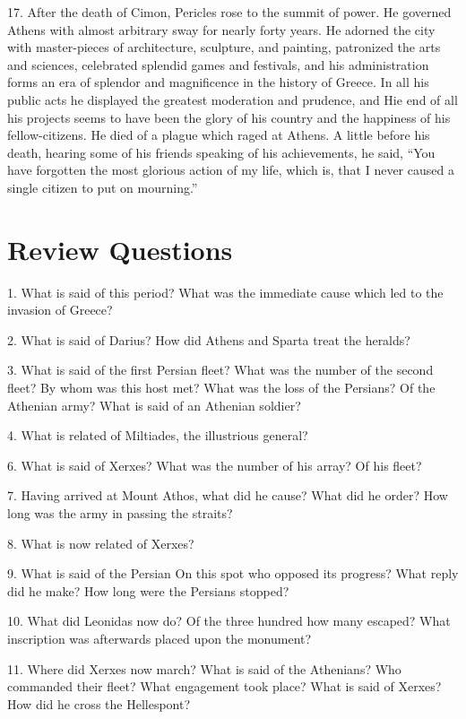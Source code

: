 \documentclass[openany,a4paper]{memoir}
\begin{document}
17. After the death of Cimon, Pericles rose to the summit 
of power. He governed Athens with almost arbitrary sway 
for nearly forty years. He adorned the city with master-pieces 
of architecture, sculpture, and painting, patronized the arts 
and sciences, celebrated splendid games and festivals, and 
his administration forms an era of splendor and magnificence 
in the history of Greece. In all his public acts he displayed 
the greatest moderation and prudence, and Hie end of all his 
projects seems to have been the glory of his country and the 
happiness of his fellow-citizens. He died of a plague which 
raged at Athens. A little before his death, hearing some of 
his friends speaking of his achievements, he said, ``You have 
forgotten the most glorious action of my life, which is, that 
I never caused a single citizen to put on mourning.''


\section{Review Questions}


1. What is said of this period? What was the immediate cause which led to the invasion of Greece? 

2. What is said of 
Darius? 
How did Athens and Sparta treat the heralds? 

3. What is said of 
the first Persian fleet? What was the number of the second fleet? By 
whom was this host met? What was the loss of the Persians? Of the 
Athenian army? What is said of an Athenian soldier? 

4. What is 
related of Miltiades, the illustrious general? 

6. What is said of Xerxes? What was the number of his array? Of 
his fleet?

7. Having arrived at Mount Athos, what did he cause?
What did he order? How long was the army in passing the straits? 

8. What is now related of Xerxes? 

9. What is said of the Persian 
On this spot who opposed its progress? What reply did he make? 
How long were the Persians stopped?

10. What did Leonidas now 
do? Of the three hundred how many escaped? What inscription was 
afterwards placed upon the monument? 

11. Where did Xerxes now 
march? What is said of the Athenians? 
Who commanded their fleet? What engagement took place? What is 
said of Xerxes? How did he cross the Hellespont? 
\end{document}
